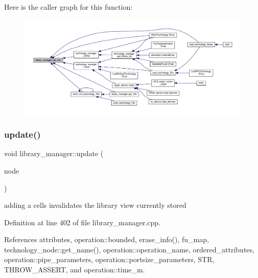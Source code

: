 Here is the caller graph for this function\+:
\nopagebreak
\begin{figure}[H]
\begin{center}
\leavevmode
\includegraphics[width=350pt]{d8/d35/classlibrary__manager_acdc0bce98076c59ca92b316fcb11ab13_icgraph}
\end{center}
\end{figure}
\mbox{\label{classlibrary__manager_a390325203aa42f2c6d71f601fd1ba8f4}} 
\subsubsection{\texorpdfstring{update()}{update()}}
{\footnotesize\ttfamily void library\+\_\+manager\+::update (\begin{DoxyParamCaption}\item[{const \hyperlink{technology__node_8hpp_a33dd193b7bd6b987bf0d8a770a819fa7}{technology\+\_\+node\+Ref} \&}]{node }\end{DoxyParamCaption})}

adding a cells invalidates the library view currently stored 

Definition at line 402 of file library\+\_\+manager.\+cpp.



References attributes, operation\+::bounded, erase\+\_\+info(), fu\+\_\+map, technology\+\_\+node\+::get\+\_\+name(), operation\+::operation\+\_\+name, ordered\+\_\+attributes, operation\+::pipe\+\_\+parameters, operation\+::portsize\+\_\+parameters, S\+TR, T\+H\+R\+O\+W\+\_\+\+A\+S\+S\+E\+RT, and operation\+::time\+\_\+m.


